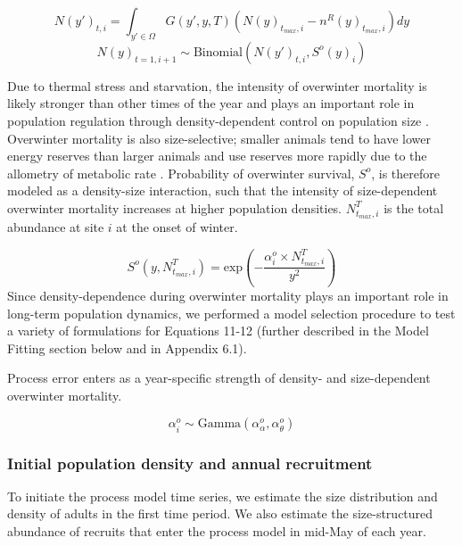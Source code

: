 \documentclass{article}
\begin{document}
\begin{equation}
N(y')_{t,i} = \int_{y' \in \Omega} G(y',y, T) (N(y)_{t_{max},i} - n^R(y)_{t_{max},i})dy
\end{equation}
\begin{equation}
N(y)_{t=1,i+1} \sim \text{Binomial}\left( N(y')_{t,i},  S^o(y)_i\right)
\end{equation}

Due to thermal stress and starvation, the intensity of overwinter mortality is likely stronger than other times of the year and plays an important role in population regulation through density-dependent control on population size \parencite{henderson1988size}. Overwinter mortality is also size-selective; smaller animals tend to have lower energy reserves than larger animals and use reserves more rapidly due to the allometry of metabolic rate \parencite{hurst2007causes}. Probability of overwinter survival, $S^o$, is therefore modeled as a density-size interaction, such that the intensity of size-dependent overwinter mortality increases at higher population densities. $N^T_{t_{max},i}$ is the total abundance at site $i$ at the onset of winter.

\begin{equation}
S^o(y,N^T_{t_{max},i}) = \text{exp}\left(-\frac{\alpha_i^o \times N^T_{t_{max},i}}{y^2}\right)
\end{equation}
Since density-dependence during overwinter mortality plays an important role in long-term population dynamics, we performed a model selection procedure to test a variety of formulations for Equations 11-12 (further described in the Model Fitting section below and in Appendix 6.1).

Process error enters as a year-specific strength of density- and size-dependent overwinter mortality.

\begin{equation}
\alpha^o_i \sim \text{Gamma}(\alpha^o_{\alpha}, \alpha^o_{\theta})
\end{equation}

\subsubsection*{Initial population density and annual recruitment}

To initiate the process model time series, we estimate the size distribution and density of adults in the first time period. We also estimate the size-structured abundance of recruits that enter the process model in mid-May of each year. 
\end{document}
